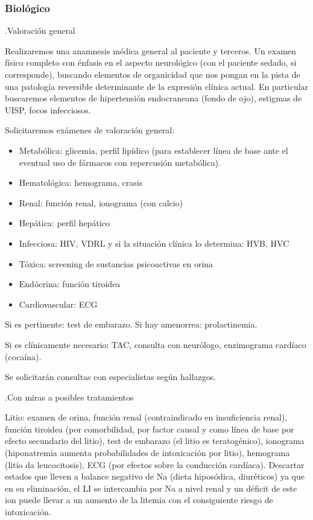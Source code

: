 \subsubsection*{Biológico}
.Valoración general

Realizaremos una anamnesis médica general al paciente y terceros. Un examen físico completo con énfasis en el aspecto neurológico (con el paciente sedado, si corresponde), buscando elementos de organicidad que nos pongan en la pista de una patología reversible determinante de la expresión clínica actual. En particular buscaremos elementos de hipertensión endocraneana (fondo de ojo), estigmas de UISP, focos infecciosos.

Solicitaremos exámenes de valoración general:
\begin{itemize}
	\item Metabólica: glicemia, perfil lipídico (para establecer línea de base ante el eventual uso de fármacos con repercusión metabólica).
	\item Hematológica: hemograma, crasis
	\item Renal: función renal, ionograma (con calcio)
	\item Hepática: perfil hepático
	\item Infecciosa: HIV, VDRL y si la situación clínica lo determina: HVB, HVC
	\item Tóxica: screening de sustancias psicoactivas en orina
	\item Endócrina: función tiroidea
	\item Cardiovascular: ECG
\end{itemize}
Si es pertinente: test de embarazo. Si hay amenorrea: prolactinemia.

Si es clínicamente necesario: TAC, consulta con neurólogo, enzimograma cardíaco (cocaína).

Se solicitarán consultas con especialistas según hallazgos.

.Con miras a posibles tratamientos

Litio: examen de orina, función renal (contraindicado en insuficiencia renal), función tiroidea (por comorbilidad, por factor causal y como línea de base por efecto secundario del litio), test de embarazo (el litio es teratogénico), ionograma (hiponatremia aumenta probabilidades de intoxicación por litio), hemograma (litio da leucocitosis), ECG (por efectos sobre la conducción cardíaca). Descartar estados que lleven a balance negativo de Na (dieta hiposódica, diuréticos) ya que en su eliminación, el LI se intercambia por Na a nivel renal y un déficit de este ion puede llevar a un aumento de la litemia con el consiguiente riesgo de intoxicación.

